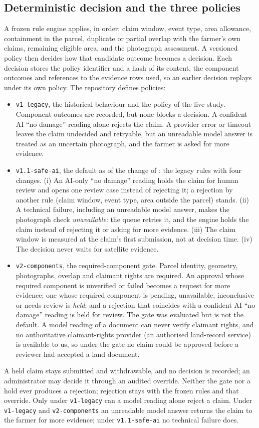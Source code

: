 \documentclass[journal]{IEEEtran}
\begin{document}
\subsection{Deterministic decision and the three policies}\label{sec:policies}
A frozen rule engine applies, in order: claim window, event type, area allowance, containment in the parcel, duplicate or partial overlap with the farmer's own claims, remaining eligible area, and the photograph assessment. A versioned policy then decides how that candidate outcome becomes a decision. Each decision stores the policy identifier and a hash of its content, the component outcomes and references to the evidence rows used, so an earlier decision replays under its own policy. The repository defines \PolicyCountWord{} policies:
\begin{itemize}
\item \texttt{v1-legacy}, the historical behaviour and the policy of the live study. Component outcomes are recorded, but none blocks a decision. A confident AI ``no damage'' reading alone rejects the claim. A provider error or timeout leaves the claim undecided and retryable, but an unreadable model answer is treated as an uncertain photograph, and the farmer is asked for more evidence.
\item \texttt{v1.1-safe-ai}, the default as of the change of \PolicySafeAiDate{}: the legacy rules with four changes. (i) An AI-only ``no damage'' reading holds the claim for human review and opens one review case instead of rejecting it; a rejection by another rule (claim window, event type, area outside the parcel) stands. (ii) A technical failure, including an unreadable model answer, makes the photograph check \emph{unavailable}: the queue retries it, and the engine holds the claim instead of rejecting it or asking for more evidence. (iii) The claim window is measured at the claim's first submission, not at decision time. (iv) The decision never waits for satellite evidence.
\item \texttt{v2-components}, the required-component gate. Parcel identity, geometry, photographs, overlap and claimant rights are required. An approval whose required component is unverified or failed becomes a request for more evidence; one whose required component is pending, unavailable, inconclusive or needs review is \emph{held}; and a rejection that coincides with a confident AI ``no damage'' reading is held for review. The gate was evaluated but is not the default. A model reading of a document can never verify claimant rights, and no authoritative claimant-rights provider (an authorised land-record service) is available to us, so under the gate no claim could be approved before a reviewer had accepted a land document.
\end{itemize}
A held claim stays submitted and withdrawable, and no decision is recorded; an administrator may decide it through an audited override. Neither the gate nor a hold ever produces a rejection; rejection stays with the frozen rules and that override. Only under \texttt{v1-legacy} can a model reading alone reject a claim. Under \texttt{v1-legacy} and \texttt{v2-components} an unreadable model answer returns the claim to the farmer for more evidence; under \texttt{v1.1-safe-ai} no technical failure does.
\end{document}
